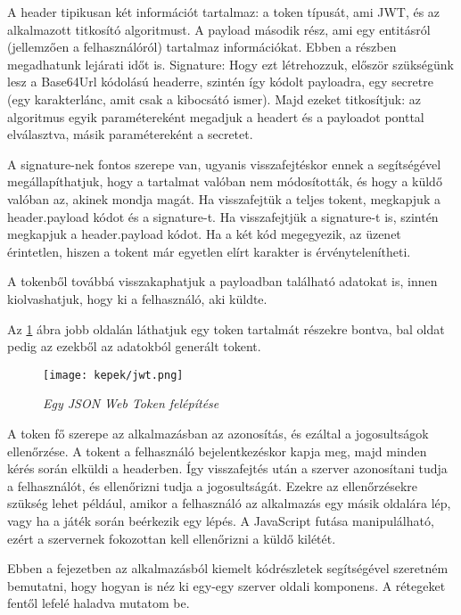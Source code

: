 A header tipikusan két információt tartalmaz: a token típusát, ami JWT, és az alkalmazott titkosító algoritmust.
A payload második rész, ami egy entitásról (jellemzően a felhasználóról) tartalmaz információkat. Ebben a részben megadhatunk lejárati időt is.
Signature: Hogy ezt létrehozzuk, először szükségünk lesz a Base64Url kódolású headerre, szintén így kódolt payloadra, egy secretre (egy karakterlánc, amit csak a kibocsátó ismer). Majd ezeket titkosítjuk: az algoritmus egyik paramétereként megadjuk a headert és a payloadot ponttal elválasztva, másik paramétereként a secretet.

A signature-nek fontos szerepe van, ugyanis visszafejtéskor ennek a segítségével megállapíthatjuk, hogy a tartalmat valóban nem módosították, és hogy a küldő valóban az, akinek mondja magát. Ha visszafejtük a teljes tokent, megkapjuk a header.payload kódot és a signature-t. Ha visszafejtjük a signature-t is, szintén megkapjuk a header.payload kódot. Ha a két kód megegyezik, az üzenet érintetlen, hiszen a tokent már egyetlen elírt karakter is érvénytelenítheti.

A tokenből továbbá visszakaphatjuk a payloadban található adatokat is, innen kiolvashatjuk, hogy ki a felhasználó, aki küldte.

Az \ref{fig:jwt} ábra jobb oldalán láthatjuk egy token tartalmát részekre bontva, bal oldat pedig az ezekből az adatokból generált tokent.

\begin{figure}[!h]
	\centering
	\texttt{[image: kepek/jwt.png]}
	\caption{\textit{Egy JSON Web Token felépítése}}
	\label{fig:jwt}
\end{figure}

A token fő szerepe az alkalmazásban az azonosítás, és ezáltal a jogosultságok ellenőrzése. A tokent a felhasználó bejelentkezéskor kapja meg, majd minden kérés során elküldi a headerben. Így visszafejtés után a szerver azonosítani tudja a felhasználót, és ellenőrizni tudja a jogosultságát. Ezekre az ellenőrzésekre szükség lehet például, amikor a felhasználó az alkalmazás egy másik oldalára lép, vagy ha a játék során beérkezik egy lépés. A JavaScript futása manipulálható, ezért a szervernek fokozottan kell ellenőrizni a küldő kilétét.

Ebben a fejezetben az alkalmazásból kiemelt kódrészletek segítségével szeretném bemutatni, hogy hogyan is néz ki egy-egy szerver oldali komponens. A rétegeket fentől lefelé haladva mutatom be.

